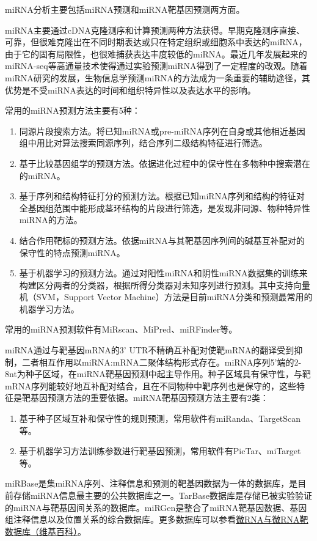 \documentclass[11pt,a4paper,twoside]{book}
\begin{document}
miRNA分析主要包括miRNA预测和miRNA靶基因预测两方面。

miRNA主要通过cDNA克隆测序和计算预测两种方法获得。早期克隆测序直接、可靠，但很难克隆出在不同时期表达或只在特定组织或细胞系中表达的miRNA，由于它的固有局限性，也很难捕获表达丰度较低的miRNA。最近几年发展起来的miRNA-seq等高通量技术使得通过实验预测miRNA得到了一定程度的改观。随着miRNA研究的发展，生物信息学预测miRNA的方法成为一条重要的辅助途径，其优势是不受miRNA表达的时间和组织特异性以及表达水平的影响。

常用的miRNA预测方法主要有5种：
\begin{enumerate}
  \item 同源片段搜索方法。将已知miRNA或pre-miRNA序列在自身或其他相近基因组中用比对算法搜索同源序列，结合序列二级结构特征进行筛选。
  \item 基于比较基因组学的预测方法。依据进化过程中的保守性在多物种中搜索潜在的miRNA。
  \item 基于序列和结构特征打分的预测方法。根据已知miRNA序列和结构的特征对全基因组范围中能形成茎环结构的片段进行筛选，是发现非同源、物种特异性miRNA的方法。
  \item 结合作用靶标的预测方法。依据miRNA与其靶基因序列间的碱基互补配对的保守性的特点预测miRNA。
  \item 基于机器学习的预测方法。通过对阳性miRNA和阴性miRNA数据集的训练来构建区分两者的分类器，根据所得分类器对未知序列进行预测。其中支持向量机（SVM，Support Vector Machine）方法是目前miRNA分类和预测最常用的机器学习方法。
\end{enumerate}
常用的miRNA预测软件有MiRscan、MiPred、miRFinder等。

miRNA通过与靶基因mRNA的3' UTR不精确互补配对使靶mRNA的翻译受到抑制，二者相互作用以miRNA:mRNA二聚体结构形式存在。miRNA序列5'端的2-8nt为种子区域，在miRNA靶基因预测中起主导作用。种子区域具有保守性，与靶mRNA序列能较好地互补配对结合，且在不同物种中靶序列也是保守的，这些特征是靶基因预测方法的重要依据。miRNA靶基因预测方法主要有2类：
\begin{enumerate}
  \item 基于种子区域互补和保守性的规则预测，常用软件有miRanda、TargetScan等。
  \item 基于机器学习方法训练参数进行靶基因预测，常用软件有PicTar、miTarget等。
\end{enumerate}

miRBase是集miRNA序列、注释信息和预测的靶基因数据为一体的数据库，是目前存储miRNA信息最主要的公共数据库之一。TarBase数据库是存储已被实验验证的miRNA与靶基因间关系的数据库。miRGen是整合了miRNA靶基因数据、基因组注释信息以及位置关系的综合数据库。更多数据库可以参看\href{http://zh.wikipedia.org/wiki/\%E5\%BE\%AERNA\%E4\%B8\%8E\%E5\%BE\%AERNA\%E9\%9D\%B6\%E6\%95\%B0\%E6\%8D\%AE\%E5\%BA\%93}{微RNA与微RNA靶数据库（维基百科）}。
\end{document}
